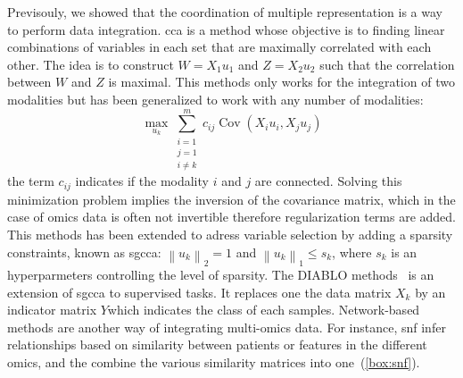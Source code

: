 \documentclass[../main.tex]{subfiles}
\begin{document}
		Previsouly, we showed that the coordination of multiple representation is a way to perform data integration.
		\Gls{cca} is a method whose objective is to finding linear combinations of variables in each set that are maximally correlated with each other.
		The idea is to construct \(W=X_1u_1\) and \(Z=X_2u_2\) such that the correlation between \(W\) and \(Z\) is maximal.
		This methods only works for the integration of two modalities but has been generalized to work with any number of modalities:
		\begin{equation}
			\max_{u_k} \sum_{\substack{i=1 \\ j=1 \\ i\neq k}}^{m} c_{ij}\operatorname{Cov}\left(X_iu_i,X_ju_j\right)
		\end{equation}
		the term \(c_{ij}\) indicates if the modality \(i\) and \(j\) are connected.
		Solving this minimization problem implies the inversion of the covariance matrix, which in the case of omics data is often not invertible therefore regularization terms are added.
		This methods has been extended to adress variable selection by adding a sparsity constraints, known as \gls{sgcca}: \({\left\|u_k \right\|}_2 = 1\) and \({\left\|u_k \right\|}_1 \leq s_k\), where \(s_k\) is an hyperparmeters controlling the level of sparsity.
		The DIABLO methods~\cite{DIABLO} is an extension of \gls{sgcca} to supervised tasks.
		It replaces one the data matrix \(X_k\) by an indicator matrix \(Y\)which indicates the class of each samples.
		Network-based methods are another way of integrating multi-omics data.
		For instance, \gls{snf} infer relationships based on similarity between patients or features in the different omics, and the combine the various similarity matrices into one~(\cref{box:snf}).
\end{document}
